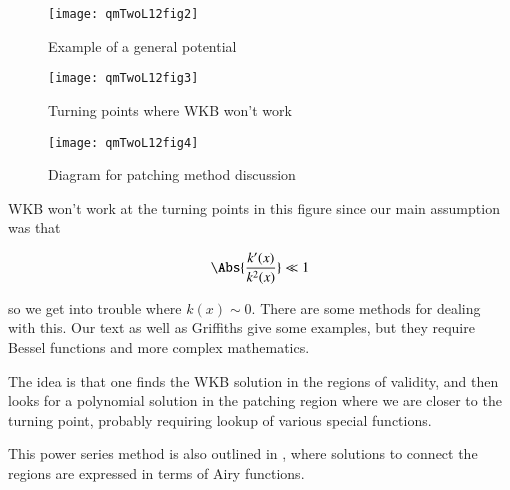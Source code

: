 \begin{figure}[htp]
   \centering
   \texttt{[image: qmTwoL12fig2]}
   \caption{Example of a general potential}\label{fig:qmTwoL13:qmTwoL12fig2}
\end{figure}

\begin{figure}[htp]
   \centering
   \texttt{[image: qmTwoL12fig3]}
   \caption{Turning points where WKB won't work}\label{fig:qmTwoL13:qmTwoL12fig3}
\end{figure}

\begin{figure}[htp]
   \centering
   \texttt{[image: qmTwoL12fig4]}
   \caption{Diagram for patching method discussion}\label{fig:qmTwoL13:qmTwoL12fig4}
\end{figure}

WKB won't work at the turning points in this figure since our main assumption was that

\begin{equation}\label{eqn:qmTwoL12:390}
\Abs{\frac{k'(x)}{k^2(x)}} \ll 1
\end{equation}

so we get into trouble where $k(x) \sim 0$.  There are some methods for dealing with this.  Our text as well as Griffiths give some examples, but they require Bessel functions and more complex mathematics.

The idea is that one finds the WKB solution in the regions of validity, and then looks for a polynomial solution in the patching region where we are closer to the turning point, probably requiring lookup of various special functions.

This power series method is also outlined in \cite{wiki:wkb}, where solutions to connect the regions are expressed in terms of Airy functions.

\EndArticle
